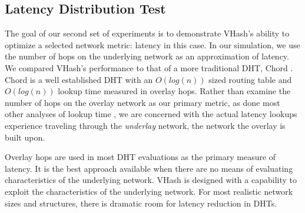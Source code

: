 \documentclass[10pt, conference, letterpaper]{IEEEtran}
\begin{document}






\subsection{Latency Distribution Test}
The goal of our second set of experiments is to demonstrate VHash's ability to optimize a selected network metric: latency in this case. 
In our simulation, we use the number of hops on the underlying network as an approximation of latency.
We compared VHash's performance to that of a more traditional DHT, Chord \cite{chord}.
Chord is a well established DHT with an $O(log(n))$ sized routing table and $O(log(n))$ lookup time measured in overlay hops.  
Rather than examine the number of hops on the overlay network as our primary metric, as done most other analyses of lookup time \cite{kademlia} \cite{chord} \cite{pastry} \cite{raynet} \cite{voronet}, we are concerned with the actual latency lookups experience traveling through the \emph{underlay} network, the network the overlay is built upon.

Overlay hops are used in most DHT evaluations as the primary measure of latency.
It is the best approach available when there are no means of evaluating characteristics of the underlying network.
VHash is designed with a capability to exploit the characteristics of the underlying network.
For most realistic network sizes and structures, there is dramatic room for latency reduction in DHTs.
\end{document}
